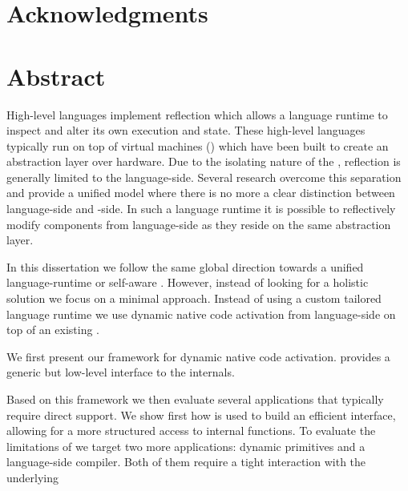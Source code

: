\documentclass[a4paper,11pt,twoside]{include/ThesisStyle}
\begin{document}


\dominitoc

\cleardoublepage
\chapter*{Acknowledgments}


\chapter*{Abstract}
High-level languages implement reflection which allows a language runtime to inspect and alter its own execution and state.
These high-level languages typically run on top of virtual machines (\VMs) which have been built to create an abstraction layer over hardware.
Due to the isolating nature of the \VM, reflection is generally limited to the language-side.
Several research \VMs overcome this separation and provide a unified model where there is no more a clear distinction between language-side and \VM-side.
In such a language runtime it is possible to reflectively modify \VM components from language-side as they reside on the same abstraction layer.

In this dissertation we follow the same global direction towards a unified language-runtime or self-aware \VM.
However, instead of looking for a holistic solution we focus on a minimal approach.
Instead of using a custom tailored language runtime we use dynamic native code activation from language-side on top of an existing \VM.

We first present \B our framework for dynamic native code activation.
\B provides a generic but low-level interface to the \VM internals.

Based on this framework we then evaluate several applications that typically require direct \VM support.
We show first how \B is used to build an efficient \FFI interface, allowing for a more structured access to \VM internal functions.
To evaluate the limitations of \B we target two more applications: dynamic primitives and a language-side \JIT compiler.
Both of them require a tight interaction with the underlying \VM
\end{document}
